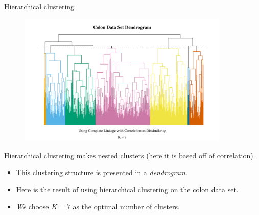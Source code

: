 \documentclass[8pt]{beamer}
\begin{document}
\begin{frame}{\color{white} Hierarchical clustering}

\begin{figure}
    \centering
    \includegraphics[width = 0.9\textwidth]{colon_den.pdf}
\end{figure}

Hierarchical clustering makes nested clusters (here it is based off of correlation).
\begin{itemize}
    \item This clustering structure is presented in a \textit{dendrogram}.
    \item Here is the result of using hierarchical clustering on the colon data set.
    \item \textit{We} choose $K = 7$ as the optimal number of clusters.
\end{itemize}
    
\end{frame}
\end{document}
